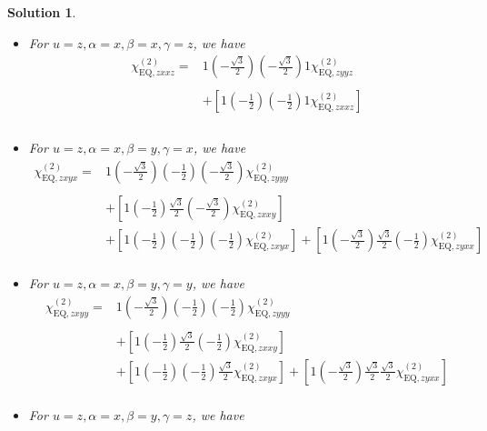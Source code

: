 \documentclass[UTF8,10pt,a4paper]{article}
\theoremstyle{Problem}
\theoremstyle{Solution}
\newtheorem*{sol}{Solution}
\begin{document}
\begin{sol}
\begin{itemize}
\begin{align}
&
\end{align}\normalsize
\item For $u=z,\alpha=x,\beta=x,\gamma=z$, we have
\footnotesize\begin{align}
\nonumber\chi_{\text{EQ},zxxz}^{(2)}=&1\left(-\frac{\sqrt{3}}{2}\right)\left(-\frac{\sqrt{3}}{2}\right)1\chi_{\text{EQ},zyyz}^{(2)}\\
\nonumber&\\
\nonumber&+\left[1\left(-\frac{1}{2}\right)\left(-\frac{1}{2}\right)1\chi_{\text{EQ},zxxz}^{(2)}\right]\\
\nonumber&\\
&
\end{align}\normalsize
\item For $u=z,\alpha=x,\beta=y,\gamma=x$, we have
\footnotesize\begin{align}
\nonumber\chi_{\text{EQ},zxyx}^{(2)}=&1\left(-\frac{\sqrt{3}}{2}\right)\left(-\frac{1}{2}\right)\left(-\frac{\sqrt{3}}{2}\right)\chi_{\text{EQ},zyyy}^{(2)}\\
\nonumber&\\
\nonumber&+\left[1\left(-\frac{1}{2}\right)\frac{\sqrt{3}}{2}\left(-\frac{\sqrt{3}}{2}\right)\chi_{\text{EQ},zxxy}^{(2)}\right]\\
\nonumber&+\left[1\left(-\frac{1}{2}\right)\left(-\frac{1}{2}\right)\left(-\frac{1}{2}\right)\chi_{\text{EQ},zxyx}^{(2)}\right]+\left[1\left(-\frac{\sqrt{3}}{2}\right)\frac{\sqrt{3}}{2}\left(-\frac{1}{2}\right)\chi_{\text{EQ},zyxx}^{(2)}\right]\\
&
\end{align}\normalsize
\item For $u=z,\alpha=x,\beta=y,\gamma=y$, we have
\footnotesize\begin{align}
\nonumber\chi_{\text{EQ},zxyy}^{(2)}=&1\left(-\frac{\sqrt{3}}{2}\right)\left(-\frac{1}{2}\right)\left(-\frac{1}{2}\right)\chi_{\text{EQ},zyyy}^{(2)}\\
\nonumber&\\
\nonumber&+\left[1\left(-\frac{1}{2}\right)\frac{\sqrt{3}}{2}\left(-\frac{1}{2}\right)\chi_{\text{EQ},zxxy}^{(2)}\right]\\
\nonumber&+\left[1\left(-\frac{1}{2}\right)\left(-\frac{1}{2}\right)\frac{\sqrt{3}}{2}\chi_{\text{EQ},zxyx}^{(2)}\right]+\left[1\left(-\frac{\sqrt{3}}{2}\right)\frac{\sqrt{3}}{2}\frac{\sqrt{3}}{2}\chi_{\text{EQ},zyxx}^{(2)}\right]\\
&
\end{align}\normalsize
\item For $u=z,\alpha=x,\beta=y,\gamma=z$, we have

\end{itemize}
\end{sol}
\end{document}
